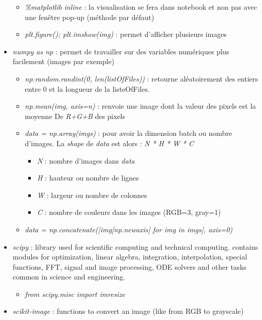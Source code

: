 \documentclass[12pt,a4paper]{article}
\begin{document}
\begin{itemize}
\begin{itemize}
\item \textit{\%matplotlib inline} : la visualisation se fera dans notebook et non pas avec une fenêtre pop-up (méthode par défaut)
\item \textit{plt.figure(); plt.imshow(img)} : permet d'afficher plusieurs images
\end{itemize}
\item \textit{numpy as np} : permet de travailler sur des variables numériques plus facilement (images par exemple)
\begin{itemize}
\item \textit{np.random.randint(0, len(listOfFiles))} : retourne aléatoirement des entiers entre 0 et la longueur de la listeOfFiles.\\
\item \textit{np.mean(img, axis=n)} : renvoie une image dont la valeur des pixels est la moyenne De \textit{R+G+B} des pixels
\item \textit{data = np.array(imgs)} : pour avoir la dimension batch ou nombre d'images. La \textit{shape} de \textit{data} est alors : \textit{N * H * W * C}
\begin{itemize}
\item \textit{N} : nombre d'images dans \textit{data}
\item \textit{H} : hauteur ou nombre de lignes
\item \textit{W} : largeur ou nombre de colonnes
\item \textit{C} : nombre de couleurs dans les images (RGB=3, gray=1)
\end{itemize}
\item \textit{data = np.concatenate([img[np.newaxis] for img in imgs], axis=0)}
\end{itemize}
\item \textit{scipy} : library used for scientific computing and technical computing. contains modules for optimization, linear algebra, integration, interpolation, special functions, FFT, signal and image processing, ODE solvers and other tasks common in science and engineering. 
\begin{itemize}
\item \textit{from scipy.misc import imresize}
\end{itemize}
\item \textit{scikit-image} : functions to convert an image (like from RGB to grayscale)
\end{itemize}
\end{document}
